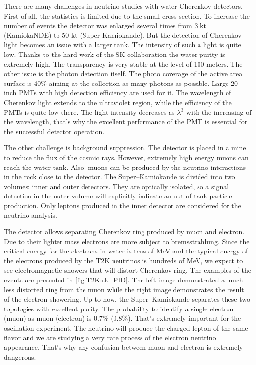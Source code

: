 \documentclass[../main.tex]{subfiles}
\begin{document}
There are many challenges in neutrino studies with water Cherenkov detectors. First of all, the statistics is limited due to the small cross-section. To increase the number of events the detector was enlarged several times from 3 kt (KamiokaNDE) to 50 kt (Super-Kamiokande). But the detection of Cherenkov light becomes an issue with a larger tank. The intensity of such a light is quite low. Thanks to the hard work of the SK collaboration the water purity is extremely high. The transparency is very stable at the level of 100 meters. The other issue is the photon detection itself. The photo coverage of the active area surface is 40\% aiming at the collection as many photons as possible. Large 20-inch PMTs with high detection efficiency are used for it. The wavelength of Cherenkov light extends to the ultraviolet region, while the efficiency of the PMTs is quite low there. The light intensity decreases as $\lambda^3$ with the increasing of the wavelength, that's why the excellent performance of the PMT is essential for the successful detector operation.

The other challenge is background suppression. The detector is placed in a mine to reduce the flux of the cosmic rays. However, extremely high energy muons can reach the water tank. Also, muons can be produced by the neutrino interactions in the rock close to the detector. The Super--Kamiokande is divided into two volumes: inner and outer detectors. They are optically isolated, so a signal detection in the outer volume will explicitly indicate an out-of-tank particle production. Only leptons produced in the inner detector are considered for the neutrino analysis.

The detector allows separating Cherenkov ring produced by muon and electron. Due to their lighter mass electrons are more subject to bremsstrahlung. Since the critical energy for the electrons in water is tens of MeV and the typical energy of the electrons produced by the T2K neutrinos is hundreds of MeV, we expect to see electromagnetic showers that will distort Cherenkov ring. The examples of the events are presented in \autoref{fig:T2K:sk_PID}. The left image demonstrated a much less distorted ring from the muon while the right image demonstrates the result of the electron showering. Up to now, the Super--Kamiokande separates these two topologies with excellent purity. The probability to identify a single electron (muon) as muon (electron) is 0.7\% (0.8\%). That's extremely important for the oscillation experiment. The neutrino will produce the charged lepton of the same flavor and we are studying a very rare process of the electron neutrino appearance. That's why any confusion between muon and electron is extremely dangerous.
\end{document}

